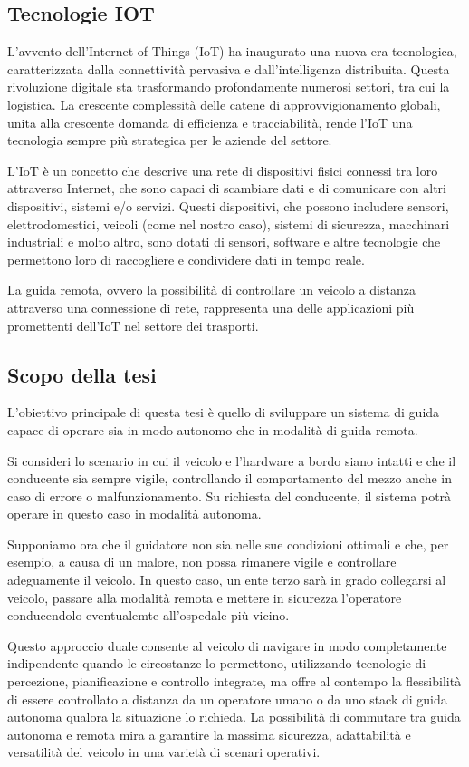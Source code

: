 
\subsection{Tecnologie IOT}
L'avvento dell'Internet of Things (IoT) ha inaugurato una nuova era tecnologica, caratterizzata dalla connettività pervasiva e dall'intelligenza distribuita. Questa rivoluzione digitale sta trasformando profondamente numerosi settori, tra cui la logistica. La crescente complessità delle catene di approvvigionamento globali, unita alla crescente domanda di efficienza e tracciabilità, rende l'IoT una tecnologia sempre più strategica per le aziende del settore.

\noindent L'IoT è un concetto che descrive una rete di dispositivi fisici connessi tra loro attraverso Internet, che sono capaci di scambiare dati e di comunicare con altri dispositivi, sistemi e/o servizi. Questi dispositivi, che possono includere sensori, elettrodomestici, veicoli (come nel nostro caso), sistemi di sicurezza, macchinari industriali e molto altro, sono dotati di sensori, software e altre tecnologie che permettono loro di raccogliere e condividere dati in tempo reale.

\noindent La guida remota, ovvero la possibilità di controllare un veicolo a distanza attraverso una connessione di rete, rappresenta una delle applicazioni più promettenti dell'IoT nel settore dei trasporti.

\subsection{Scopo della tesi}
L'obiettivo principale di questa tesi è quello di sviluppare un sistema di guida capace di operare sia in modo autonomo che in modalità di guida remota.

\noindent Si consideri lo scenario in cui il veicolo e l'hardware a bordo siano intatti e che il conducente sia sempre vigile, controllando il comportamento del mezzo anche in caso di errore o malfunzionamento. Su richiesta del conducente, il sistema potrà operare in questo caso in modalità autonoma.

\noindent Supponiamo ora che il guidatore non sia nelle sue condizioni ottimali e che, per esempio, a causa di un malore, non possa rimanere vigile e controllare adeguamente il veicolo. In questo caso, un ente terzo sarà in grado collegarsi al veicolo, passare alla modalità remota e mettere in sicurezza l'operatore conducendolo eventualemte all'ospedale più vicino.

\noindent Questo approccio duale consente al veicolo di navigare in modo completamente indipendente quando le circostanze lo permettono, utilizzando tecnologie di percezione, pianificazione e controllo integrate, ma offre al contempo la flessibilità di essere controllato a distanza da un operatore umano o da uno stack di guida autonoma qualora la situazione lo richieda. La possibilità di commutare tra guida autonoma e remota mira a garantire la massima sicurezza, adattabilità e versatilità del veicolo in una varietà di scenari operativi.


